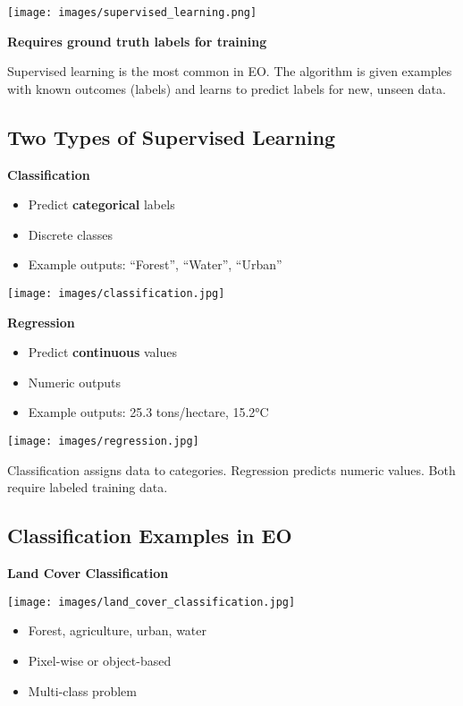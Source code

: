 \documentclass[
  letterpaper,
  DIV=11,
  numbers=noendperiod]{scrartcl}
\providecommand{\tightlist}{%
  \setlength{\itemsep}{0pt}\setlength{\parskip}{0pt}}
\begin{document}
\texttt{[image: images/supervised\_learning.png]}

\textbf{Requires ground truth labels for training}

Supervised learning is the most common in EO. The algorithm is given
examples with known outcomes (labels) and learns to predict labels for
new, unseen data.

\subsection{Two Types of Supervised
Learning}\label{two-types-of-supervised-learning}

\textbf{Classification}

\begin{itemize}
\tightlist
\item
  Predict \textbf{categorical} labels
\item
  Discrete classes
\item
  Example outputs: ``Forest'', ``Water'', ``Urban''
\end{itemize}

\texttt{[image: images/classification.jpg]}

\textbf{Regression}

\begin{itemize}
\tightlist
\item
  Predict \textbf{continuous} values
\item
  Numeric outputs
\item
  Example outputs: 25.3 tons/hectare, 15.2°C
\end{itemize}

\texttt{[image: images/regression.jpg]}

Classification assigns data to categories. Regression predicts numeric
values. Both require labeled training data.

\subsection{Classification Examples in
EO}\label{classification-examples-in-eo}

\textbf{Land Cover Classification}

\texttt{[image: images/land\_cover\_classification.jpg]}

\begin{itemize}
\tightlist
\item
  Forest, agriculture, urban, water
\item
  Pixel-wise or object-based
\item
  Multi-class problem
\end{itemize}
\end{document}
